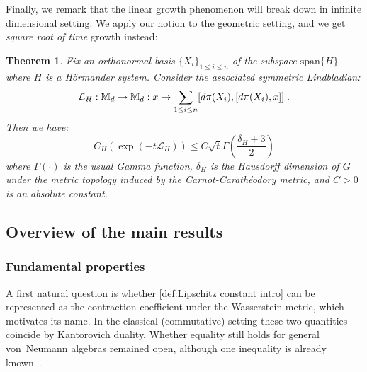 \documentclass[11pt,reqno]{amsart}
\numberwithin{equation}{section}
\newtheorem{theorem}[lemma]{Theorem}
\newcommand{\mb}{\mathbb}
\newcommand{\pl}{\hspace{.1cm}}
\begin{document}
Finally, we remark that the linear growth phenomenon will break down in infinite dimensional setting. We apply our notion to the geometric setting, and we get \textit{square root of time} growth instead:
\begin{theorem}\label{theorem:costDiam}
	Fix an orthonormal basis $\{X_i\}_{1\leq i \leq n}$ of the subspace $\text{span}\{H\}$ where $H$ is a H\"ormander system. Consider the associated symmetric Lindbladian:
			\begin{equation}
				\mathcal{L}_H:\mb M_d\rightarrow \mb M_d: x\mapsto \sum_{1\leq i \leq n}[d\pi(X_i),[d\pi(X_i), x]]\pl.
			\end{equation}
			Then we have:
			\begin{equation}
				C_H(\exp(-t\mathcal{L}_H)) \leq C\sqrt{t}\Gamma(\frac{\delta_H +3}{2})
			\end{equation}
			where $\Gamma(\cdot)$ is the usual Gamma function, $\delta_H$ is the Hausdorff dimension of $G$ under the metric topology induced by the Carnot-Carath\'eodory metric, and $C>0$ is an absolute constant. 

	\end{theorem}


\fi



\subsection{Overview of the main results}
\subsubsection{Fundamental properties}
A first natural question is whether \eqref{def:Lipschitz constant intro} can be represented as the contraction coefficient under the Wasserstein metric, which motivates its name.  In the classical (commutative) setting these two quantities coincide by Kantorovich duality. Whether equality still holds for general von~Neumann algebras remained open, although one inequality is already known~\cite[Proposition 4.4]{gaorouze24}.  
\end{document}
